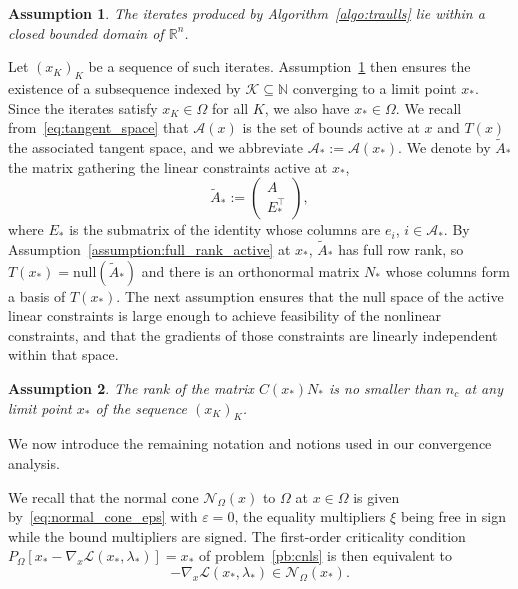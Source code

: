 \documentclass{article}
\numberwithin{equation}{section}
\newcommand{\RR}{{\mathbb{R}}} %
\newcommand{\NN}{{\mathbb{N}}} %
\newcommand{\calA}{{\mathcal{A}}}
\newcommand{\calL}{{\mathcal{L}}}
\newcommand{\calK}{{\mathcal{K}}}
\newcommand{\calN}{{\mathcal{N}}}
\newcommand{\proj}[2]{P_{#1} \left[ {#2} \right]} %
\theoremstyle{plain}
\newtheorem{assumption}{Assumption}
\begin{document}
	\begin{assumption}\label{assumption:iterates_domain_bounded}
		The iterates produced by Algorithm~\ref{algo:traulls} lie within a closed bounded domain of $\RR^n$.
	\end{assumption}

Let $(x_K)_K$ be a sequence of such iterates. Assumption~\ref{assumption:iterates_domain_bounded} then ensures the existence of a subsequence indexed by $\calK \subseteq \NN$ converging to a limit point $x_*$. Since the iterates satisfy $x_K \in \Omega$ for all $K$, we also have $x_* \in \Omega$. We recall from~\eqref{eq:tangent_space} that $\calA(x)$ is the set of bounds active at $x$ and $T(x)$ the associated tangent space, and we abbreviate $\calA_* := \calA(x_*)$. We denote by $\tilde A_*$ the matrix gathering the linear constraints active at $x_*$,
\begin{equation*}
	\tilde A_* := \begin{pmatrix} A \\ E^\top_* \end{pmatrix},
\end{equation*}
where $E_*$ is the submatrix of the identity whose columns are $e_i$, $i \in \calA_*$. By Assumption~\ref{assumption:full_rank_active} at $x_*$, $\tilde A_*$ has full row rank, so $T(x_*) = \mathrm{null}(\tilde A_*)$ and there is an orthonormal matrix $N_*$ whose columns form a basis of $T(x_*)$. The next assumption ensures that the null space of the active linear constraints is large enough to achieve feasibility of the nonlinear constraints, and that the gradients of those constraints are linearly independent within that space.

	\begin{assumption}\label{assumption:cq_null_space_jacobian}
		The rank of the matrix $C(x_*)N_*$ is no smaller than $n_c$ at any limit point $x_*$ of the sequence $(x_K)_K$.
	\end{assumption}

	We now introduce the remaining notation and notions used in our convergence analysis.

We recall that the normal cone $\calN_\Omega(x)$ to $\Omega$ at $x \in \Omega$ is given by~\eqref{eq:normal_cone_eps} with $\varepsilon = 0$, the equality multipliers $\xi$ being free in sign while the bound multipliers are signed. The first-order criticality condition $\proj{\Omega}{x_*-\nabla_x\calL(x_*,\lambda_*)}=x_*$ of problem~\eqref{pb:cnls} is then equivalent to
\[-\nabla_x\calL(x_*,\lambda_*)\in \calN_\Omega(x_*).\]
\end{document}
